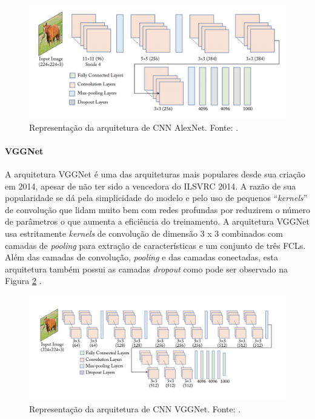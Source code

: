 \begin{figure}[!ht]
	\centering
	\includegraphics[width=1\textwidth]{./img/alexnet}
	\caption{Representação da arquitetura de CNN AlexNet. Fonte: \cite{ref:khan}.}
	\label{img:alexnet}
\end{figure}

\paragraph{VGGNet} A arquitetura VGGNet é uma das arquiteturas mais populares desde sua criação em 2014, apesar de não ter sido a vencedora do ILSVRC 2014. A razão de sua popularidade se dá pela simplicidade do modelo e pelo uso de pequenos ``\textit{kernels}'' de convolução que lidam muito bem com redes profundas por reduzirem o número de parâmetros o que aumenta a eficiência do treinamento. A arquitetura VGGNet usa estritamente \textit{kernels} de convolução de dimensão 3 x 3 combinados com camadas de \textit{pooling} para extração de características e um conjunto de três FCLs. Além das camadas de convolução, \textit{pooling} e das camadas conectadas, esta arquitetura também possui as camadas \textit{dropout} como pode ser observado na Figura \ref{img:vggnet} \cite{ref:khan}.

\begin{figure}[!ht]
	\centering
	\includegraphics[width=1\textwidth]{./img/vggnet}
	\caption{Representação da arquitetura de CNN VGGNet. Fonte: \cite{ref:khan}.}
	\label{img:vggnet}
\end{figure}

